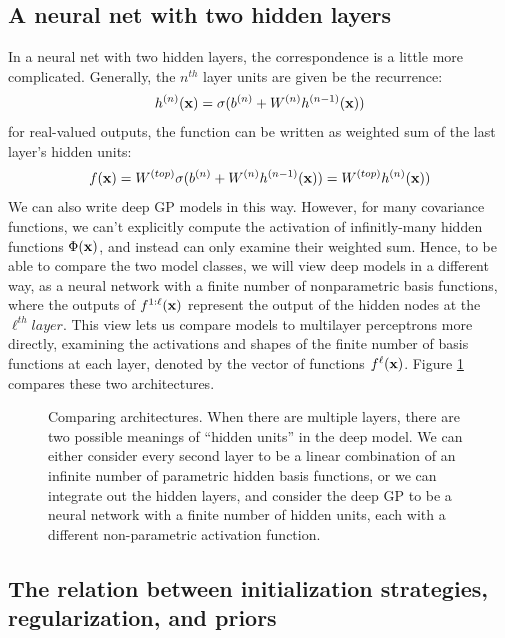 \documentclass{article}
\begin{document}
\subsection{A neural net with two hidden layers}

In a neural net with two hidden layers, the correspondence is a little more complicated.  Generally, the $n^{th}$ layer units are given be the recurrence:
\begin{align}
h^{(n)}({\bf{x}}) = \sigma( b^{(n)} + W^{(n)} h^{(n-1)}({\bf{x}}) )
\end{align}
%
for real-valued outputs, the function can be written as weighted sum of the last layer's hidden units:
%
\begin{align}
f({\bf{x}}) = W^{(top)} \sigma( b^{(n)} + W^{(n)} h^{(n-1)}({\bf{x}}) ) = W^{(top)} h^{(n)}({\bf{x}}) )
\end{align}
%
We can also write deep GP models in this way.  However, for many covariance functions, we can't explicitly compute the activation of infinitly-many hidden functions $\Phi({\bf{x}})$, and instead can only examine their weighted sum.  Hence, to be able to compare the two model classes, we will view deep \gp{} models in a different way, as a neural network with a finite number of nonparametric basis functions, where the outputs of $f^{1:\ell}({\bf{x}})$ represent the output of the hidden nodes at the $\ell^{th} layer.$
%
%
This view lets us compare \gp{} models to multilayer perceptrons more directly, examining the activations and shapes of the finite number of basis functions at each layer, denoted by the vector of functions $f^\ell({\bf{x}})$.
Figure \ref{fig:architectures} compares these two architectures.


\begin{figure}

\caption{Comparing architectures.  When there are multiple layers, there are two possible meanings of ``hidden units'' in the deep \gp{} model.  We can either consider every second layer to be a linear combination of an infinite number of parametric hidden basis functions, or we can integrate out the hidden layers, and consider the deep GP to be a neural network with a finite number of hidden units, each with a different non-parametric activation function.}
\label{fig:architectures}
\end{figure}


\subsection{The relation between initialization strategies, regularization, and priors}
\end{document}
